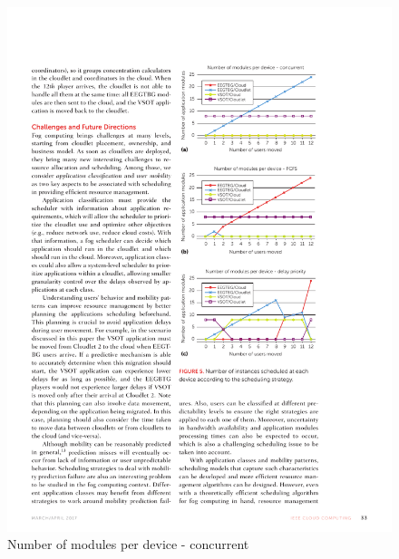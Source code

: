 \documentclass[10pt, pdf, xcolor=pdftex, dvipsnames, table]{beamer}
\begin{document}
\begin{frame}
 	\begin{figure}[htbp]
 		\centerline{\includegraphics[scale=1.2]{images/5a.pdf}}
 		\caption[Number of modules per device - concurrent]{Number of modules per device - concurrent}
 	\end{figure}
\end{frame}
\end{document}
